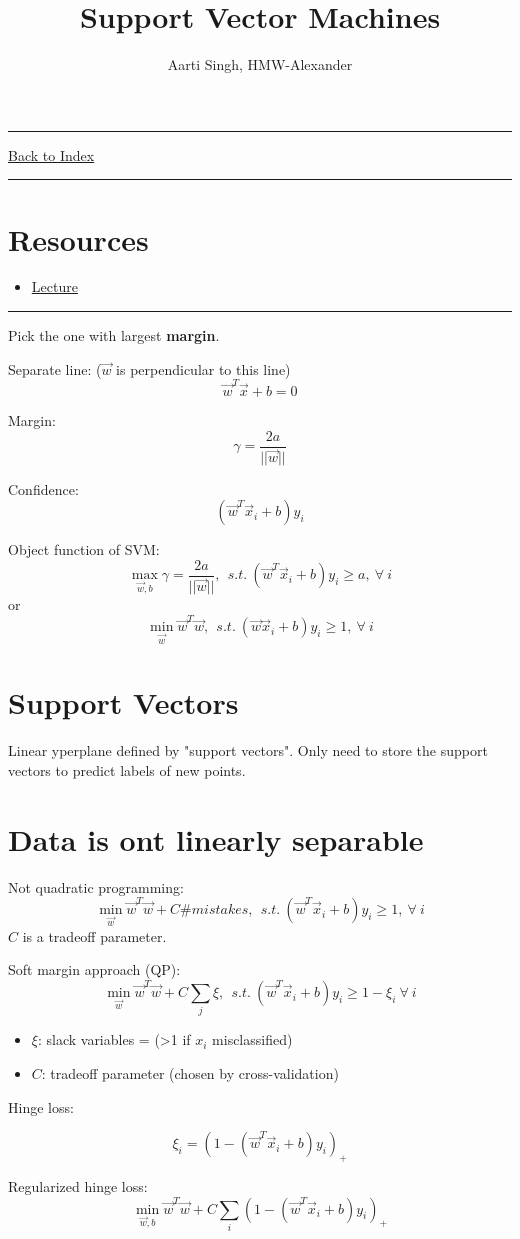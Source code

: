 \documentclass[letterpaper,10pt]{article}
\title{\textbf{Support Vector Machines}}
\author{Aarti Singh, HMW-Alexander}
\newcommand{\panhline}{\begin{center}\rule{\textwidth}{1pt}\end{center}}
\begin{document}
\maketitle

\panhline
\href{../index.html}{Back to Index}

\panhline
\tableofcontents

\section*{Resources}

\begin{itemize}
	\item \href{../../Lectures/LectureFile.pdf}{Lecture}
\end{itemize}

\panhline

Pick the one with largest \textbf{margin}.

Separate line: ($\vec{w}$ is perpendicular to this line)
$$\vec{w}^T\vec{x}+b=0$$

Margin:
$$\gamma=\frac{2a}{||\vec{w}||}$$

Confidence:
$$(\vec{w}^T\vec{x}_i+b)y_i$$

Object function of SVM:
$$\max_{\vec{w},b} \gamma = \frac{2a}{||\vec{w}||},~~s.t.~(\vec{w}^T\vec{x}_i+b)y_i \geq a,~\forall~i$$
or
$$\min_{\vec{w}} \vec{w}^T\vec{w},~~s.t.~(\vec{w}\vec{x}_i+b)y_i \geq 1,~\forall~i$$

\section{Support Vectors}

Linear yperplane defined by "support vectors". Only need to store the support vectors to predict labels of new points.

\section{Data is ont linearly separable}

Not quadratic programming:
$$\min_{\vec{w}}\vec{w}^T\vec{w} + C\#mistakes,~~s.t.~(\vec{w}^T\vec{x}_i+b)y_i\geq 1,~\forall~i$$
$C$ is a tradeoff parameter.

Soft margin approach (QP):
$$\min_{\vec{w}}\vec{w}^T\vec{w}+C\sum_j \xi,~~s.t.~(\vec{w}^T\vec{x}_i+b)y_i \geq 1-\xi_i~\forall~i$$
\begin{itemize}
	\item $\xi$: slack variables = (>1 if $x_i$ misclassified)
	\item $C$: tradeoff parameter (chosen by cross-validation)
\end{itemize}

Hinge loss:

$$\xi_i=(1-(\vec{w}^T\vec{x}_i+b)y_i)_+$$

Regularized hinge loss:
$$\min_{\vec{w},b} \vec{w}^T\vec{w} + C\sum_i(1-(\vec{w}^T\vec{x}_i+b)y_i)_+$$
\end{document}
